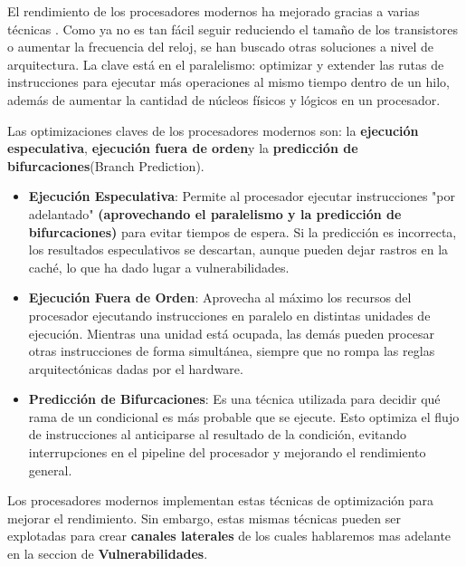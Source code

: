 \documentclass[lettersize,compsoc]{IEEEtran}
\begin{document}
El rendimiento de los procesadores modernos ha mejorado gracias a varias técnicas \cite{paralelismo}. Como ya no es tan fácil seguir reduciendo el tamaño de los transistores o aumentar la frecuencia del reloj, se han buscado otras soluciones a nivel de arquitectura. La clave está en el paralelismo: optimizar y extender las rutas de instrucciones para ejecutar más operaciones al mismo tiempo dentro de un hilo, además de aumentar la cantidad de núcleos físicos y lógicos en un procesador.

Las optimizaciones claves de los procesadores modernos son: la \textbf{ejecución especulativa}, \textbf{ejecución fuera de orden}y la \textbf{predicción de bifurcaciones}(Branch Prediction). 
\begin{itemize}
  \item \textbf{Ejecución Especulativa}: Permite al procesador ejecutar instrucciones "por adelantado" \textbf{(aprovechando el paralelismo y la predicción de bifurcaciones)} para evitar tiempos de espera. Si la predicción es incorrecta, los resultados especulativos se descartan, aunque pueden dejar rastros en la caché, lo que ha dado lugar a vulnerabilidades.
  \item \textbf{Ejecución Fuera de Orden}: Aprovecha al máximo los recursos del procesador ejecutando instrucciones en paralelo en distintas unidades de ejecución. Mientras una unidad está ocupada, las demás pueden procesar otras instrucciones de forma simultánea, siempre que no rompa las reglas arquitectónicas dadas por el hardware.
  \item \textbf{Predicción de Bifurcaciones}: Es una técnica utilizada para decidir qué rama de un condicional es más probable que se ejecute. Esto optimiza el flujo de instrucciones al anticiparse al resultado de la condición, evitando interrupciones en el pipeline del procesador y mejorando el rendimiento general.
  \end{itemize}
  

Los procesadores modernos implementan estas técnicas de optimización para mejorar el rendimiento. Sin embargo, estas mismas técnicas pueden ser explotadas para crear \textbf{canales laterales} de los cuales hablaremos mas adelante en la seccion de \textbf{Vulnerabilidades}. 
\end{document}

